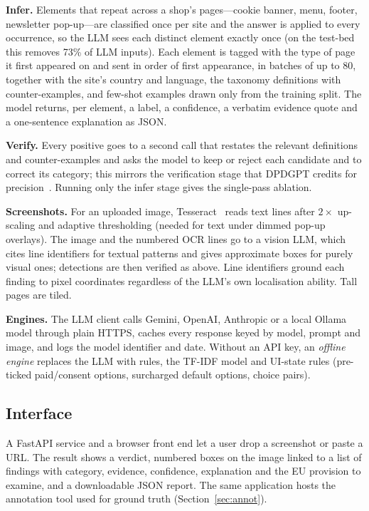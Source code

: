\documentclass[conference]{IEEEtran}
\begin{document}
\textbf{Infer.} Elements that repeat across a shop's pages---cookie banner, menu, footer, newsletter
pop-up---are classified once per site and the answer is applied to every occurrence, so the LLM sees each
distinct element exactly once (on the test-bed this removes 73\% of LLM inputs). Each element is tagged with the
type of page it first appeared on and sent in order of first appearance, in batches of up to 80, together with
the site's country and language, the taxonomy definitions with counter-examples, and few-shot examples drawn only
from the training split. The model returns, per element, a label, a confidence, a verbatim evidence quote and a
one-sentence explanation as JSON.

\textbf{Verify.} Every positive goes to a second call that restates the relevant definitions and
counter-examples and asks the model to keep or reject each candidate and to correct its category; this
mirrors the verification stage that DPDGPT credits for precision~\cite{lin2026dpdgpt}. Running only the
infer stage gives the single-pass ablation.

\textbf{Screenshots.} For an uploaded image, Tesseract~\cite{smith2007tesseract} reads text lines after
$2\times$ up-scaling and adaptive thresholding (needed for text under dimmed pop-up overlays). The image
and the numbered OCR lines go to a vision LLM, which cites line identifiers for textual patterns and gives
approximate boxes for purely visual ones; detections are then verified as above. Line identifiers ground
each finding to pixel coordinates regardless of the LLM's own localisation ability. Tall pages are tiled.

\textbf{Engines.} The LLM client calls Gemini, OpenAI, Anthropic or a local Ollama model through plain
HTTPS, caches every response keyed by model, prompt and image, and logs the model identifier and date.
Without an API key, an \emph{offline engine} replaces the LLM with rules, the TF-IDF model and UI-state
rules (pre-ticked paid/consent options, surcharged default options, choice pairs).

\subsection{Interface}
A FastAPI service and a browser front end let a user drop a screenshot or paste a URL. The result shows a
verdict, numbered boxes on the image linked to a list of findings with category, evidence, confidence,
explanation and the EU provision to examine, and a downloadable JSON report. The same application hosts
the annotation tool used for ground truth (Section~\ref{sec:annot}).
\end{document}
